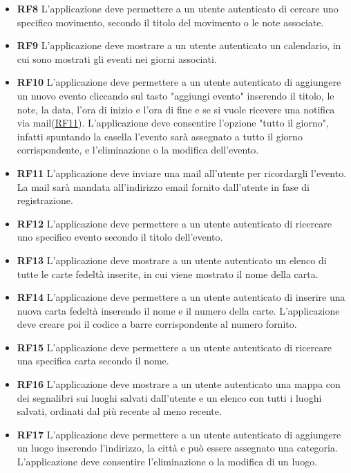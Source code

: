 \documentclass[a4paper,12pt]{article}
\begin{document}
\begin{itemize}
\item \textbf {\hypertarget{RF8}{RF8}} L'applicazione deve permettere a un utente autenticato di cercare uno specifico movimento, secondo il titolo del movimento o le note associate.
\item \textbf {\hypertarget{RF9}{RF9}} L'applicazione deve mostrare a un utente autenticato un calendario, in cui sono mostrati gli eventi nei giorni associati.
\item \textbf {\hypertarget{RF10}{RF10}} L'applicazione deve permettere a un utente autenticato di aggiungere un nuovo evento cliccando sul tasto "aggiungi evento" inserendo il titolo, le note, la data, l'ora di inizio e l'ora di fine e se si vuole ricevere una notifica via mail(\hyperlink{RF11}{RF11}). L'applicazione deve consentire l'opzione "tutto il giorno", infatti spuntando la casella l'evento sarà assegnato a tutto il giorno corrispondente, e l'eliminazione o la modifica dell'evento.
\item \textbf {\hypertarget{RF11}{RF11}} L'applicazione deve inviare una mail all'utente per ricordargli l'evento. La mail sarà mandata all'indirizzo email fornito dall'utente in fase di registrazione.
\item \textbf {\hypertarget{RF12}{RF12}} L'applicazione deve permettere a un utente autenticato di ricercare uno specifico evento secondo il titolo dell'evento.
\item \textbf {\hypertarget{RF13}{RF13}} L'applicazione deve mostrare a un utente autenticato un elenco di tutte le carte fedeltà inserite, in cui viene mostrato il nome della carta.
\item \textbf {\hypertarget{RF14}{RF14}} L'applicazione deve permettere a un utente autenticato di inserire una nuova carta fedeltà inserendo il nome e il numero della carte. L'applicazione deve creare poi il codice a barre corrispondente al numero fornito.
\item \textbf {\hypertarget{RF15}{RF15}} L'applicazione deve permettere a un utente autenticato di ricercare una specifica carta secondo il nome.
\item \textbf {\hypertarget{RF16}{RF16}} L'applicazione deve mostrare a un utente autenticato una mappa con dei segnalibri sui luoghi salvati dall'utente e un elenco con tutti i luoghi salvati, ordinati dal più recente al meno recente.
\item \textbf {\hypertarget{RF17}{RF17}} L'applicazione deve permettere a un utente autenticato di aggiungere un luogo inserendo l'indirizzo, la città e può essere assegnato una categoria. L'applicazione deve consentire l'eliminazione o la modifica di un luogo.

\end{itemize}
\end{document}
